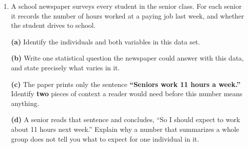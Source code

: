 \documentclass[10pt]{article}
\begin{document}
\begin{enumerate}[leftmargin=1.9em, itemsep=0.16in, resume]

  \item A school newspaper surveys every student in the senior class. For each senior it records
        the number of hours worked at a paying job last week, and whether the student drives to
        school.

        \boxguard[17]
        \vspace{6pt}
        \textbf{(a)} Identify the individuals and both variables in this data set.\\[4pt]

        \boxguard[17]
        \vspace{6pt}
        \textbf{(b)} Write one statistical question the newspaper could answer with this data,
        and state precisely what varies in it.\\[4pt]

        \boxguard[17]
        \vspace{6pt}
        \textbf{(c)} The paper prints only the sentence \textbf{``Seniors work 11 hours a week.''}
        Identify \textbf{two} pieces of context a reader would need before this number means
        anything.\\[4pt]

        \boxguard[17]
        \vspace{6pt}
        \textbf{(d)} A senior reads that sentence and concludes, ``So I should expect to work
        about 11 hours next week.'' Explain why a number that summarizes a whole group does not
        tell you what to expect for one individual in it.\\[4pt]

\end{enumerate}
\end{document}
